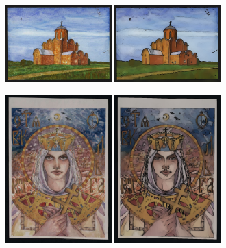\begin{figure}
     \centering
     \begin{subfigure}[b]{0.5\textwidth}
         \centering
         \includegraphics[width=0.45\textwidth]{images/style_augments/1998_14-17_0101_RUS_R_C.jpg}\hfil
         \includegraphics[width=0.45\textwidth]{images/style_augments/1998_14-17_0101_RUS_R_C_water.jpg}
         \caption{}
     \end{subfigure}
     \hfil
     \begin{subfigure}[b]{0.5\textwidth}
         \centering
         \includegraphics[width=0.45\textwidth]{images/style_augments/2019_14-17_0193_RUS_R_C.jpg}\hfil
         \includegraphics[width=0.45\textwidth]{images/style_augments/2019_14-17_0193_RUS_R_C_water.jpg}

\end{subfigure}
\end{figure}
